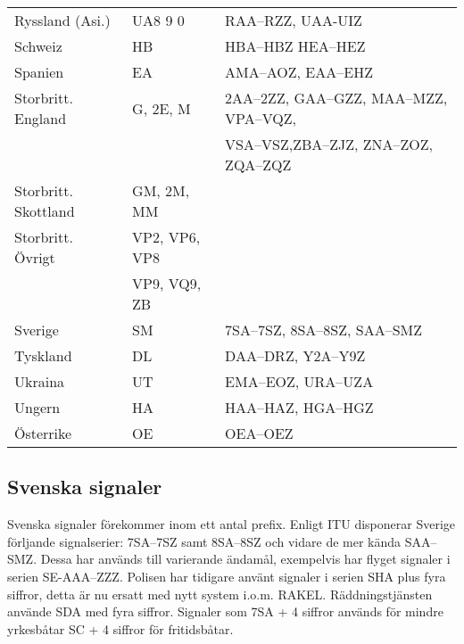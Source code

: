 \begin{center}
\begin{footnotesize}
\begin{longtable}{lll}
			Ryssland (Asi.)               & UA8 9 0        & RAA--RZZ, UAA-UIZ                                 \\
			Schweiz                       & HB             & HBA--HBZ HEA--HEZ                                 \\
			Spanien                       & EA             & AMA--AOZ, EAA--EHZ                                \\
			Storbritt. England            & G, 2E, M       & 2AA--2ZZ, GAA--GZZ, MAA--MZZ, VPA--VQZ,           \\
			                              &                & VSA--VSZ,ZBA--ZJZ, ZNA--ZOZ, ZQA--ZQZ             \\
			Storbritt. Skottland          & GM, 2M, MM     &                                                   \\
			Storbritt. Övrigt             & VP2, VP6, VP8  &                                                   \\
			                              & VP9, VQ9, ZB   &                                                   \\
			Sverige                       & SM             & 7SA--7SZ, 8SA--8SZ, SAA--SMZ                      \\
			Tyskland                      & DL             & DAA--DRZ, Y2A--Y9Z                                \\
			Ukraina                       & UT             & EMA--EOZ, URA--UZA                                \\
			Ungern                        & HA             & HAA--HAZ, HGA--HGZ                                \\
			Österrike                     & OE             & OEA--OEZ\\
		\end{longtable}
	\end{footnotesize}
\end{center}

\subsection{Svenska signaler}

Svenska signaler förekommer inom ett antal prefix. Enligt ITU disponerar Sverige
förljande signalserier: 7SA--7SZ samt 8SA--8SZ och vidare de mer kända SAA--SMZ.
Dessa har används till varierande ändamål, exempelvis har flyget signaler i
serien SE-AAA--ZZZ. Polisen har tidigare använt signaler i serien SHA plus fyra
siffror, detta är nu ersatt med nytt system i.o.m. RAKEL. Räddningstjänsten
använde SDA med fyra siffror. Signaler som 7SA + 4 siffror används för mindre
yrkesbåtar SC + 4 siffror för fritidsbåtar.


